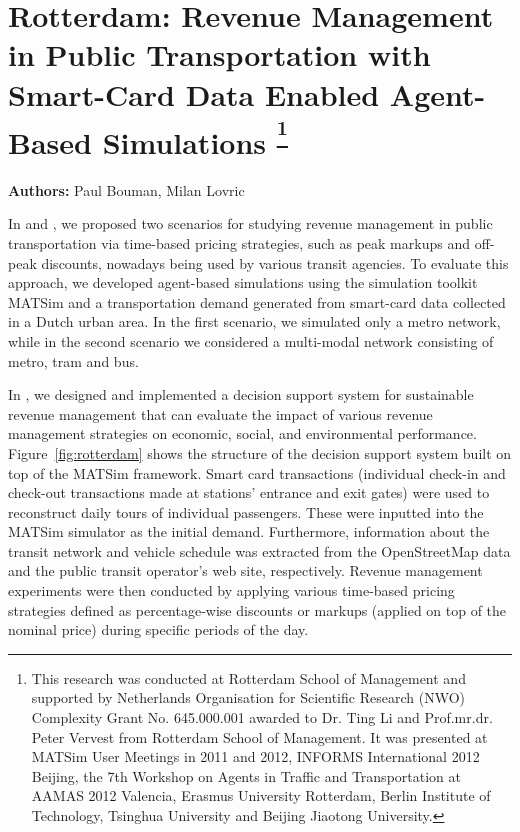 \section{Rotterdam: Revenue Management in Public Transportation with Smart-Card Data Enabled Agent-Based Simulations \textsuperscript{\footnotesize{\footnote{This research was conducted at Rotterdam School of Management and
supported by Netherlands Organisation for Scientific Research (NWO)
Complexity Grant No. 645.000.001 awarded to Dr. Ting Li and Prof.mr.dr. Peter Vervest from
Rotterdam School of Management. It was presented at MATSim User Meetings in 2011 and 2012,
INFORMS International 2012 Beijing, the 7th Workshop on Agents in Traffic and Transportation at
AAMAS 2012 Valencia, Erasmus University Rotterdam, Berlin Institute of Technology, Tsinghua
University and Beijing Jiaotong University.}}}}
\label{sec:rotterdam}
\hfill \textbf{Authors:} Paul Bouman, Milan Lovric

In \citet[][]{LovricEtAl_DSS_2013} and \citet[][]{BoumanEtAl_AAMAS_2012}, we proposed two scenarios for studying revenue management in public transportation via time-based pricing strategies, such as peak markups and off-peak discounts, nowadays being used by various transit agencies. To evaluate this approach, we developed agent-based simulations using the simulation toolkit MATSim and a transportation demand generated from smart-card data collected in a Dutch urban area. In the first scenario, we simulated only a metro network, while in the second scenario we considered a multi-modal network consisting of metro, tram and bus.

In \citet[][]{LovricEtAl_DSS_2013}, we designed and implemented a decision support system for sustainable revenue management that can evaluate the impact of various revenue management strategies on economic, social, and environmental performance. Figure~\ref{fig:rotterdam} shows the structure of the decision support system built on top of the MATSim framework. Smart card transactions (individual check-in and check-out transactions made at stations' entrance and exit gates) were used to reconstruct daily tours of individual passengers. These were inputted into the MATSim simulator as the initial demand. Furthermore, information about the transit network and vehicle schedule was extracted from the OpenStreetMap data and the public transit operator's web site, respectively. Revenue management experiments were then conducted by applying various time-based pricing strategies defined as percentage-wise discounts or markups (applied on top of the nominal price) during specific periods of the day. 

